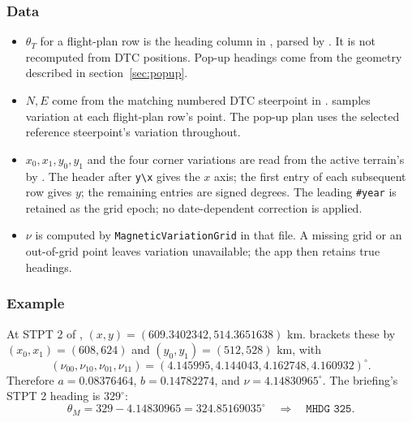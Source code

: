 \documentclass[10pt,a4paper]{amsart}
\begin{document}
\subsubsection*{Data}
\begin{itemize}
\setlength{\itemsep}{0pt}
\setlength{\parsep}{0pt}
\item $\theta_T$ for a flight-plan row is the heading column in
, parsed by
. It is not recomputed from
DTC positions. Pop-up headings come from the geometry described in
section~\ref{sec:popup}.
\item $N,E$ come from the matching numbered DTC steerpoint in
. 
samples variation at each flight-plan row's point. The pop-up plan
uses the selected reference steerpoint's variation throughout.
\item $x_0,x_1,y_0,y_1$ and the four corner variations are read from
the active terrain's  by
.
The header after \texttt{y\textbackslash x} gives the $x$ axis;
the first entry of each subsequent row gives $y$; the remaining
entries are signed degrees. The leading \texttt{\#year} is retained
as the grid epoch; no date-dependent correction is applied.
\item $\nu$ is computed by \texttt{MagneticVariationGrid} in that
file. A missing grid or an out-of-grid point leaves variation
unavailable; the app then retains true headings.
\end{itemize}

\subsubsection*{Example}
At STPT 2 of ,
$(x,y)=(609.3402342,514.3651638)$ km.
 brackets these
by $(x_0,x_1)=(608,624)$ and $(y_0,y_1)=(512,528)$ km, with
\[
 (\nu_{00},\nu_{10},\nu_{01},\nu_{11})
 =(4.145995,4.144043,4.162748,4.160932)^\circ.
\]
Therefore $a=0.08376464$, $b=0.14782274$, and
$\nu=4.14830965^\circ$. The briefing's STPT 2 heading is $329^\circ$:
\[
 \theta_M=329-4.14830965=324.85169035^\circ
 \quad\Longrightarrow\quad \texttt{MHDG 325}.
\]
\end{document}
